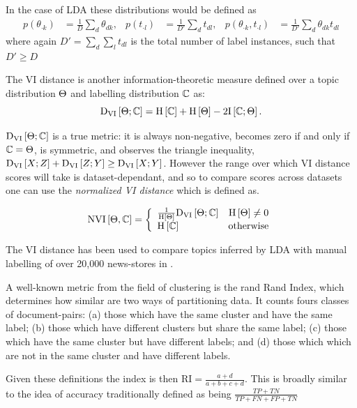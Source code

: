In the case of LDA these distributions would be defined as
\begin{align}
p(\theta_{\cdot k}) & =  \frac{1}{D} \sum_d \theta_{dk} ,&
p(t_{\cdot l}) &= \frac{1}{D'} \sum_d t_{dl} ,& 
p(\theta_{\cdot k}, t_{\cdot l}) & = \frac{1}{D'} \sum_d \theta_{dk} t_{dl}
\end{align}
where again $D' = \sum_d \sum_l t_{dl}$ is the total number of label instances, such that $D' \geq D$


The VI distance\cite{Meila2003} is another information-theoretic measure defined over a topic distribution $\Theta$ and labelling distribution $\mathbb{C}$ as:
\begin{equation}
\text{D}_\text{VI} \left[ \Theta; \mathbb{C} \right] = \text{H} \left[ \mathbb{C} \right] + \text{H} \left[ \Theta \right] - 2 \text{I} \left[ \mathbb{C} ; \Theta \right].
\end{equation}

$\text{D}_\text{VI} \left[ \Theta; \mathbb{C} \right]$ is a true metric: it is always non-negative, becomes zero if and only if $\mathbb{C} = \Theta$, is symmetric, and observes the triangle inequality, $\text{D}_\text{VI} \left[ X; Z \right] + \text{D}_\text{VI} \left[ Z; Y \right] \geq \text{D}_\text{VI} \left[ X; Y \right]$. However the range over which VI distance scores will take is dataset-dependant, and so to compare scores across datasets one can use the \emph{normalized VI distance}\cite{Reichart2009} which is defined as. 

\begin{align}
\text{NVI}\left[ \Theta, \mathbb{C} \right] = \left\{ \begin{array}{lr}
     \frac{1}{\text{H} \left[ \Theta \right]}\text{D}_\text{VI} \left[ \Theta; \mathbb{C} \right] & \text{H} \left[ \Theta \right] \neq 0 \\
     \text{H} \left[ \mathbb{C} \right] & \text{otherwise}
 \end{array}\right.
\end{align}


The VI distance has been used to compare topics inferred by LDA with manual labelling of over 20,000 news-stores in \cite{HeinrichEtAl2005}. 


A well-known metric from the field of clustering is the rand Rand Index, which determines how similar are two ways of partitioning data. It counts fours classes of document-pairs: (a) those which have the same cluster and have the same label; (b) those which have different clusters but share the same label; (c) those which have the same cluster but have different labels; and (d) those which which are not in the same cluster and have different labels.

Given these definitions the index is then $\text{RI} = \frac{a + d}{a + b + c + d}$. This is broadly similar to the idea of accuracy traditionally defined as being $\frac{TP + TN}{TP + FN + FP + TN}$

